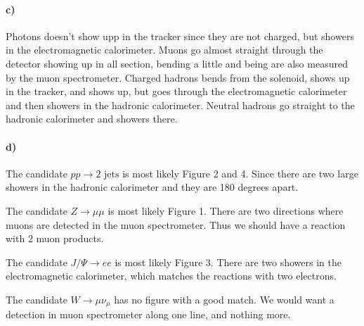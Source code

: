 \paragraph{c)} Photons doesn't show upp in the tracker since they are not charged, but showers in the electromagnetic calorimeter. Muons go almost straight through the detector showing up in all section, bending a little and being are also measured by the muon spectrometer. Charged hadrons bends from the solenoid, shows up in the tracker, and shows up, but goes through the electromagnetic calorimeter and then showers in the hadronic calorimeter. Neutral hadrons go straight to the hadronic calorimeter and showers there.

\paragraph{d)} The candidate $p p \to \text{2 jets}$ is most likely Figure 2 and 4. Since there are two large showers in the hadronic calorimeter and they are 180 degrees apart.

The candidate $Z \to \mu \mu$ is most likely Figure 1. There are two directions where muons are detected in the muon spectrometer. Thus we should have a reaction with 2 muon products.

The candidate $J/\Psi \to e e$ is most likely Figure 3. There are two showers in the electromagnetic calorimeter, which matches the reactions with two electrons.

The candidate $W \to \mu \nu_\mu$ has no figure with a good match. We would want a detection in muon spectrometer along one line, and nothing more.

